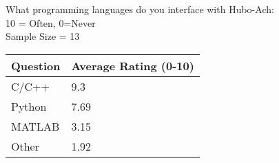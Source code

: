 \begin{table}
\centering
\caption{Q3: Survey on the Unified Algorithmic Framework for Complex System and Humanoids, Hubo-Ach:}\label{table:q3}
What programming languages do you interface with Hubo-Ach:\\
\small
10 = Often, 0=Never\\
Sample Size = 13\\
\normalsize
\begin{longtable}{|p{9cm} | p{3cm} | }
\hline
Question	&	Average Rating (0-10)	\\	\hline
\hline
\hline
C/C++		& 	9.3 \\
\hline
Python		&	7.69\\
\hline
MATLAB		&	3.15 \\
\hline		
Other		&	1.92 \\
\hline


\end{longtable}
\end{table}
